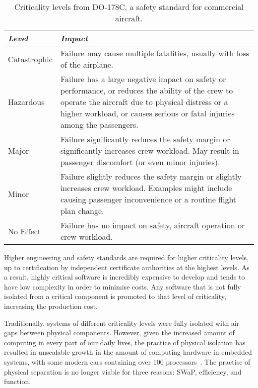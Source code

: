 \begin{table}
     \centering
     \begin{tabular}{ l p{10cm}} \toprule
         \emph{Level}   & \emph{Impact} \\ \midrule
         Catastrophic   & Failure may cause multiple fatalities, usually with loss of the airplane. \\
         Hazardous      & Failure has a large negative impact on safety or performance, or reduces the
                          ability of the crew to operate the aircraft due to physical distress or 
                          a higher workload, or causes serious or fatal injuries among the passengers.\\
         Major          & Failure significantly reduces the safety margin or significantly increases
                          crew workload. May result in passenger discomfort (or even minor
                          injuries).\\
         Minor          & Failure slightly reduces the safety margin or slightly increases crew
                          workload. Examples might include causing passenger inconvenience or a
                          routine flight plan change. \\
         No Effect      & Failure has no impact on safety, aircraft operation or crew workload. \\
         \bottomrule
     \end{tabular}
     \caption{Criticality levels from DO-178C, a safety standard for commercial aircraft.}
     \label{tab:criticality_table}
 \end{table}

Higher engineering and safety standards are required for higher criticality levels, up to
certification by independent certificate authorities at the highest levels. As a result, highly
critical software is incredibly expensive to develop and tends to have low complexity in order to
minimise costs. Any software that is not fully isolated from a critical component is promoted to
that level of criticality, increasing the production cost.

Traditionally, systems of different criticality levels were fully isolated with
air gaps between physical components. However, given the increased amount of
computing in every part of our daily lives, the practice of physical isolation
has resulted in unscalable growth in the amount of computing hardware in
embedded systems, with some modern cars containing over 100
processors~\citep{Hergenhan_Heiser_08}. The practise of physical separation is no 
longer viable for three reasons: \gls{SWaP}, efficiency, and function.

